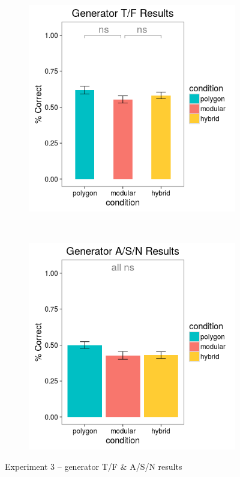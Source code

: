 \documentclass[man,mask,10pt]{apa6}
\begin{document}
\begin{figure}[H]
\centering
\begin{subfigure}[c]{0.3\textwidth}
\centering
\includegraphics[width=\textwidth]{figures/3/gen_TF_r.png}
\end{subfigure}
~
\begin{subfigure}[c]{0.3\textwidth}
\centering
\includegraphics[width=\textwidth]{figures/3/gen_ASN_r.png}
\end{subfigure}
\caption{Experiment 3 -- generator T/F \& A/S/N results}
\label{ex3_TFASN}
\end{figure}\noindent 
\end{document}
